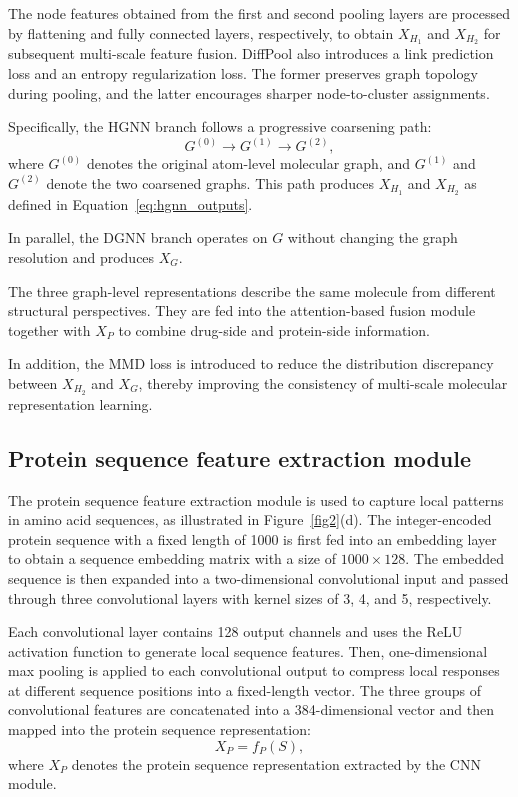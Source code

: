 \documentclass[pdflatex,sn-mathphys-num]{sn-jnl}%
\theoremstyle{thmstyleone}%
\theoremstyle{thmstyletwo}%
\theoremstyle{thmstylethree}%
\begin{document}
The node features obtained from the first and second pooling layers are processed by flattening and fully connected layers, respectively, to obtain $X_{H_1}$ and $X_{H_2}$ for subsequent multi-scale feature fusion. DiffPool also introduces a link prediction loss and an entropy regularization loss. The former preserves graph topology during pooling, and the latter encourages sharper node-to-cluster assignments.

Specifically, the HGNN branch follows a progressive coarsening path:
\begin{equation}
G^{(0)} \rightarrow G^{(1)} \rightarrow G^{(2)},
\end{equation}
where $G^{(0)}$ denotes the original atom-level molecular graph, and $G^{(1)}$ and $G^{(2)}$ denote the two coarsened graphs. This path produces $X_{H_1}$ and $X_{H_2}$ as defined in Equation~\ref{eq:hgnn_outputs}.

In parallel, the DGNN branch operates on $G$ without changing the graph resolution and produces $X_G$.

The three graph-level representations describe the same molecule from different structural perspectives. They are fed into the attention-based fusion module together with $X_P$ to combine drug-side and protein-side information.

In addition, the MMD loss is introduced to reduce the distribution discrepancy between $X_{H_2}$ and $X_G$, thereby improving the consistency of multi-scale molecular representation learning.


\subsection{Protein sequence feature extraction module}\label{subsec:protein_cnn_module}

The protein sequence feature extraction module is used to capture local patterns in amino acid sequences, as illustrated in Figure~\ref{fig2}(d). The integer-encoded protein sequence with a fixed length of 1000 is first fed into an embedding layer to obtain a sequence embedding matrix with a size of $1000\times128$. The embedded sequence is then expanded into a two-dimensional convolutional input and passed through three convolutional layers with kernel sizes of 3, 4, and 5, respectively.

Each convolutional layer contains 128 output channels and uses the ReLU activation function to generate local sequence features. Then, one-dimensional max pooling is applied to each convolutional output to compress local responses at different sequence positions into a fixed-length vector. The three groups of convolutional features are concatenated into a 384-dimensional vector and then mapped into the protein sequence representation:
\begin{equation}
X_P=f_P(S),
\end{equation}
where $X_P$ denotes the protein sequence representation extracted by the CNN module.
\end{document}
